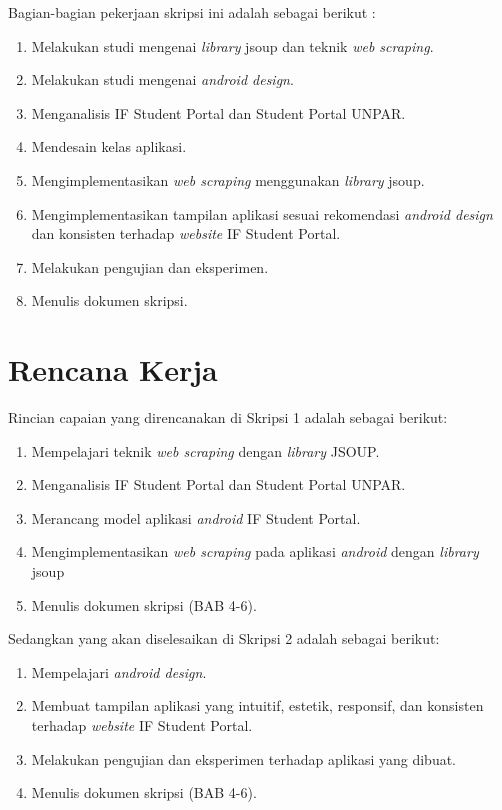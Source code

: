 \documentclass[a4paper,twoside]{article}
\begin{document}
Bagian-bagian pekerjaan skripsi ini adalah sebagai berikut :
	\begin{enumerate}
		\item Melakukan studi mengenai \textit{library} jsoup dan teknik \textit{web scraping}.
		\item Melakukan studi mengenai \textit{android design}.
		\item Menganalisis IF Student Portal dan Student Portal UNPAR.
		\item Mendesain kelas aplikasi.
		\item Mengimplementasikan \textit{web scraping} menggunakan \textit{library} jsoup.
		\item Mengimplementasikan tampilan aplikasi sesuai rekomendasi \textit{android design} dan konsisten terhadap \textit{website} IF Student Portal.
		\item Melakukan pengujian dan eksperimen.
		\item Menulis dokumen skripsi.
	\end{enumerate}

\section{Rencana Kerja}
Rincian capaian yang direncanakan di Skripsi 1 adalah sebagai berikut:
\begin{enumerate}
\item Mempelajari teknik \textit{web scraping} dengan \textit{library} JSOUP.
\item Menganalisis IF Student Portal dan Student Portal UNPAR.
\item Merancang model aplikasi \textit{android} IF Student Portal.
\item Mengimplementasikan \textit{web scraping} pada aplikasi \textit{android} dengan \textit{library} jsoup
\item Menulis dokumen skripsi (BAB 4-6).
\end{enumerate}

Sedangkan yang akan diselesaikan di Skripsi 2 adalah sebagai berikut:
\begin{enumerate}
\item Mempelajari \textit{android design}.
\item Membuat tampilan aplikasi yang intuitif, estetik, responsif, dan konsisten terhadap \textit{website} IF Student Portal.
\item Melakukan pengujian dan eksperimen terhadap aplikasi yang dibuat.
\item Menulis dokumen skripsi (BAB 4-6).
\end{enumerate}
\end{document}
